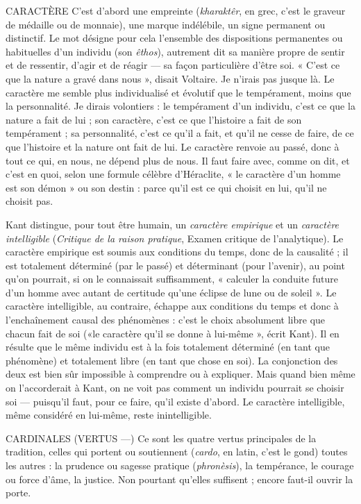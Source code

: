 CARACTÈRE C’est d’abord une empreinte ({\it kharaktêr}, en grec, c’est le graveur
de médaille ou de monnaie), une marque indélébile, un
signe permanent ou distinctif. Le mot désigne pour cela l’ensemble des dispositions
permanentes ou habituelles d’un individu (son {\it êthos}), autrement
dit sa manière propre de sentir et de ressentir, d’agir et de réagir — sa façon
particulière d’être soi. « C’est ce que la nature a gravé dans nous », disait
Voltaire. Je n’irais pas jusque là. Le caractère me semble plus individualisé
et évolutif que le tempérament, moins que la personnalité. Je dirais
volontiers : le tempérament d’un individu, c’est ce que la nature a fait de
lui ; son caractère, c’est ce que l’histoire a fait de son tempérament ; sa personnalité,
c’est ce qu’il a fait, et qu’il ne cesse de faire, de ce que l’histoire et
la nature ont fait de lui. Le caractère renvoie au passé, donc à tout ce qui, en
nous, ne dépend plus de nous. Il faut faire avec, comme on dit, et c’est en
quoi, selon une formule célèbre d'Héraclite, « le caractère d’un homme est
son démon » ou son destin : parce qu’il est ce qui choisit en lui, qu’il ne
choisit pas.

Kant distingue, pour tout être humain, un {\it caractère empirique} et un {\it caractère
intelligible} ({\it Critique de la raison pratique}, Examen critique de l’analytique).
Le caractère empirique est soumis aux conditions du temps, donc de la
causalité ; il est totalement déterminé (par le passé) et déterminant (pour
l'avenir), au point qu’on pourrait, si on le connaissait suffisamment, « calculer
la conduite future d’un homme avec autant de certitude qu’une éclipse de lune
ou de soleil ». Le caractère intelligible, au contraire, échappe aux conditions du
temps et donc à l’enchaînement causal des phénomènes : c’est le choix absolument
libre que chacun fait de soi («le caractère qu’il se donne à lui-même »,
écrit Kant). Il en résulte que le même individu est à la fois totalement déterminé
(en tant que phénomène) et totalement libre (en tant que chose en soi).
La conjonction des deux est bien sûr impossible à comprendre ou à expliquer.
Mais quand bien même on l’accorderait à Kant, on ne voit pas comment un
individu pourrait se choisir soi — puisqu'il faut, pour ce faire, qu’il existe
d’abord. Le caractère intelligible, même considéré en lui-même, reste inintelligible.

CARDINALES (VERTUS —) Ce sont les quatre vertus principales de la tradition,
celles qui portent ou soutiennent ({\it cardo},
en latin, c’est le gond) toutes les autres : la prudence ou sagesse pratique ({\it phronèsis}),
la tempérance, le courage ou force d’âme, la justice. Non pourtant
qu’elles suffisent ; encore faut-il ouvrir la porte.

